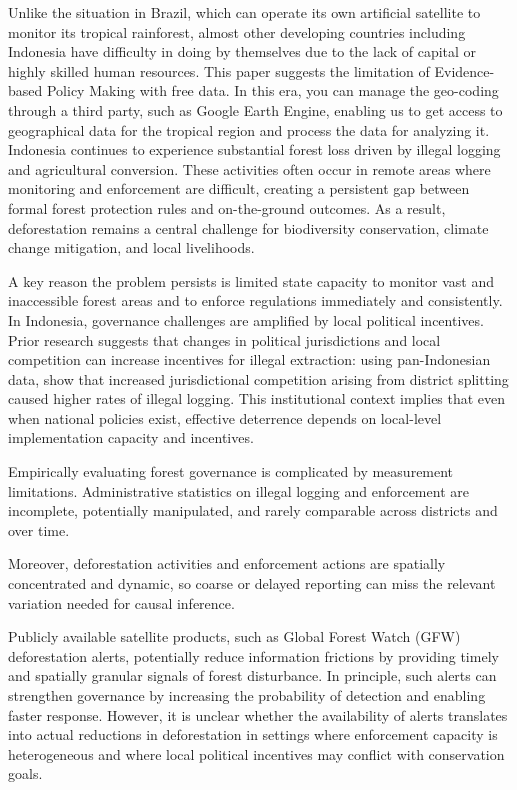\documentclass[hidelinks,12pt]{article}
\begin{document}
 Unlike the situation in Brazil, which can operate its own artificial satellite to monitor its tropical rainforest, almost other developing countries including Indonesia have difficulty in doing by themselves due to the lack of capital or highly skilled human resources. This paper suggests the limitation of Evidence-based Policy Making with free data. In this era, you can manage the geo-coding through a third party, such as Google Earth Engine, enabling us to get access to geographical data for the tropical region and process the data for analyzing it. \\




Indonesia continues to experience substantial forest loss driven by illegal logging and agricultural conversion. These activities often occur in remote areas where monitoring and enforcement are difficult, creating a persistent gap between formal forest protection rules and on-the-ground outcomes. As a result, deforestation remains a central challenge for biodiversity conservation, climate change mitigation, and local livelihoods.

A key reason the problem persists is limited state capacity to monitor vast and inaccessible forest areas and to enforce regulations immediately and consistently. In Indonesia, governance challenges are amplified by local political incentives. Prior research suggests that changes in political jurisdictions and local competition can increase incentives for illegal extraction: using pan-Indonesian data, \citet{burgess2012political} show that increased jurisdictional competition arising from district splitting caused higher rates of illegal logging. This institutional context implies that even when national policies exist, effective deterrence depends on local-level implementation capacity and incentives.

Empirically evaluating forest governance is complicated by measurement limitations. Administrative statistics on illegal logging and enforcement are incomplete, potentially manipulated, and rarely comparable across districts and over time.

Moreover, deforestation activities and enforcement actions are spatially concentrated and dynamic, so coarse or delayed reporting can miss the relevant variation needed for causal inference.

Publicly available satellite products, such as Global Forest Watch (GFW) deforestation alerts, potentially reduce information frictions by providing timely and spatially granular signals of forest disturbance. In principle, such alerts can strengthen governance by increasing the probability of detection and enabling faster response. However, it is unclear whether the availability of alerts translates into actual reductions in deforestation in settings where enforcement capacity is heterogeneous and where local political incentives may conflict with conservation goals.
\end{document}
